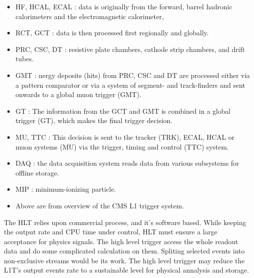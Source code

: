 		\begin{itemize}
			\item HF, HCAL, ECAL : data is originally from the forward, barrel hadronic calorimeters and the electromagnetic calorimeter,
			\item RCT, GCT : data is then processed first regionally and globally.
			\item PRC, CSC, DT : resistive plate chambers, cathode strip chambers, and drift tubes.
			\item GMT : nergy deposits (hits) from PRC, CSC and DT are processed either via a pattern comparator or via a system of segment- and track-finders and sent onwards to a global muon trigger (GMT). 
			\item GT : The information from the GCT and GMT is combined in a global trigger (GT), which makes the final trigger decision.
			\item MU, TTC : This decision is sent to the tracker (TRK), ECAL, HCAL or muon systems (MU) via the trigger, timing and control (TTC) system. 
			\item DAQ : the data acquisition system reads data from various subsystems for offline storage. 
			\item MIP : minimum-ionizing particle.
			\item Above are from overview of the CMS L1 trigger system. \cite{Khachatryan:2016bia}
			\label{PhysObj:itm:L1T}
		\end{itemize}

		The HLT relies upon commercial process, and it's software based. While keeping the output rate and CPU time under control, HLT must ensure a large acceptance for physics signals. The high level trigger access the whole readout data and do some complicated calculation on them. Spliting selected events into non-exclusive streams would be its work. The high level trrigger may reduce the L1T's output events rate to a sustainable level for physical annalysis and storage.
		





\FloatBarrier
